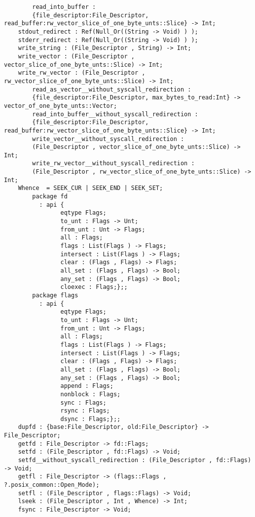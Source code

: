 \begin{verbatim}
        read_into_buffer :
        {file_descriptor:File_Descriptor, read_buffer:rw_vector_slice_of_one_byte_unts::Slice} -> Int;
    stdout_redirect : Ref(Null_Or((String -> Void) ) );
    stderr_redirect : Ref(Null_Or((String -> Void) ) );
    write_string : (File_Descriptor , String) -> Int;
    write_vector : (File_Descriptor , vector_slice_of_one_byte_unts::Slice) -> Int;
    write_rw_vector : (File_Descriptor , rw_vector_slice_of_one_byte_unts::Slice) -> Int;
        read_as_vector__without_syscall_redirection :
        {file_descriptor:File_Descriptor, max_bytes_to_read:Int} -> vector_of_one_byte_unts::Vector;
        read_into_buffer__without_syscall_redirection :
        {file_descriptor:File_Descriptor, read_buffer:rw_vector_slice_of_one_byte_unts::Slice} -> Int;
        write_vector__without_syscall_redirection :
        (File_Descriptor , vector_slice_of_one_byte_unts::Slice) -> Int;
        write_rw_vector__without_syscall_redirection :
        (File_Descriptor , rw_vector_slice_of_one_byte_unts::Slice) -> Int;
    Whence  = SEEK_CUR | SEEK_END | SEEK_SET;
        package fd
          : api {
                eqtype Flags;
                to_unt : Flags -> Unt;
                from_unt : Unt -> Flags;
                all : Flags;
                flags : List(Flags ) -> Flags;
                intersect : List(Flags ) -> Flags;
                clear : (Flags , Flags) -> Flags;
                all_set : (Flags , Flags) -> Bool;
                any_set : (Flags , Flags) -> Bool;
                cloexec : Flags;};;
        package flags
          : api {
                eqtype Flags;
                to_unt : Flags -> Unt;
                from_unt : Unt -> Flags;
                all : Flags;
                flags : List(Flags ) -> Flags;
                intersect : List(Flags ) -> Flags;
                clear : (Flags , Flags) -> Flags;
                all_set : (Flags , Flags) -> Bool;
                any_set : (Flags , Flags) -> Bool;
                append : Flags;
                nonblock : Flags;
                sync : Flags;
                rsync : Flags;
                dsync : Flags;};;
    dupfd : {base:File_Descriptor, old:File_Descriptor} -> File_Descriptor;
    getfd : File_Descriptor -> fd::Flags;
    setfd : (File_Descriptor , fd::Flags) -> Void;
    setfd__without_syscall_redirection : (File_Descriptor , fd::Flags) -> Void;
    getfl : File_Descriptor -> (flags::Flags , ?.posix_common::Open_Mode);
    setfl : (File_Descriptor , flags::Flags) -> Void;
    lseek : (File_Descriptor , Int , Whence) -> Int;
    fsync : File_Descriptor -> Void;

\end{verbatim}
